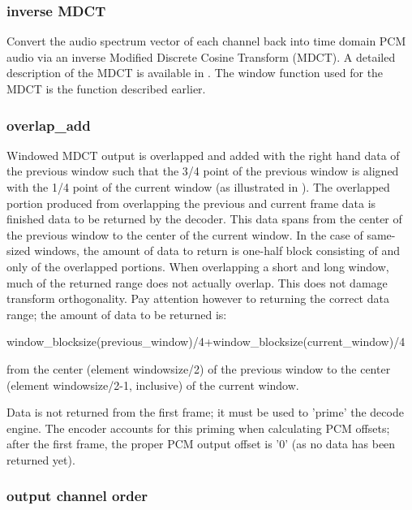 \subsubsection{inverse MDCT}

Convert the audio spectrum vector of each channel back into time
domain PCM audio via an inverse Modified Discrete Cosine Transform
(MDCT).  A detailed description of the MDCT is available in \cite{Sporer/Brandenburg/Edler}.  The window
function used for the MDCT is the function described earlier.



\subsubsection{overlap_add}

Windowed MDCT output is overlapped and added with the right hand data
of the previous window such that the 3/4 point of the previous window
is aligned with the 1/4 point of the current window (as illustrated in
).  The overlapped portion
produced from overlapping the previous and current frame data is
finished data to be returned by the decoder.  This data spans from the
center of the previous window to the center of the current window.  In
the case of same-sized windows, the amount of data to return is
one-half block consisting of and only of the overlapped portions. When
overlapping a short and long window, much of the returned range does not
actually overlap.  This does not damage transform orthogonality.  Pay
attention however to returning the correct data range; the amount of
data to be returned is:

\begin{programlisting}
window_blocksize(previous_window)/4+window_blocksize(current_window)/4
\end{programlisting}

from the center (element windowsize/2) of the previous window to the
center (element windowsize/2-1, inclusive) of the current window.

Data is not returned from the first frame; it must be used to 'prime'
the decode engine.  The encoder accounts for this priming when
calculating PCM offsets; after the first frame, the proper PCM output
offset is '0' (as no data has been returned yet).



\subsubsection{output channel order}

